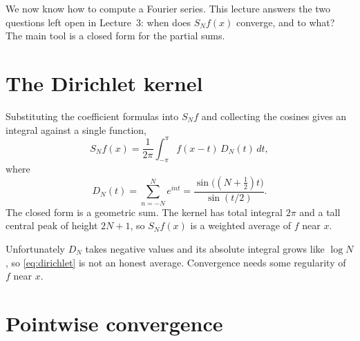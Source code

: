 \documentclass[11pt]{article}
\begin{document}
We now know how to compute a Fourier series. This lecture answers the two
questions left open in Lecture~3: when does $S_N f(x)$ converge, and to what?
The main tool is a closed form for the partial sums.

\section{The Dirichlet kernel}

Substituting the coefficient formulas into $S_N f$ and collecting the cosines
gives an integral against a single function,
\begin{equation}\label{eq:dirichlet}
  S_N f(x) = \frac{1}{2\pi}\int_{-\pi}^{\pi} f(x-t)\,D_N(t)\,dt,
\end{equation}
where
\[
  D_N(t) = \sum_{n=-N}^{N} e^{int} = \frac{\sin\bigl((N+\tfrac12)t\bigr)}{\sin(t/2)}.
\]
The closed form is a geometric sum. The kernel has
total integral $2\pi$ and a tall central peak of height $2N+1$, so $S_N f(x)$
is a weighted average of $f$ near $x$.

\begin{figure}[h]
\end{figure}

Unfortunately $D_N$ takes negative values and its absolute integral grows like
$\log N$, so \eqref{eq:dirichlet} is not an honest average. Convergence needs
some regularity of $f$ near $x$.

\section{Pointwise convergence}
\end{document}
